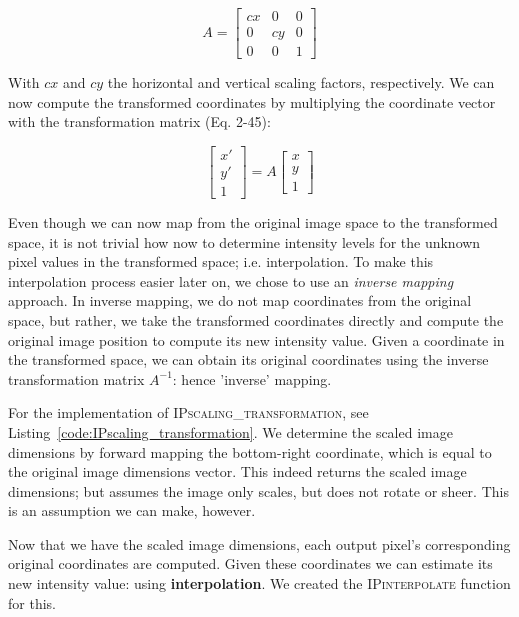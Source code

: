 \documentclass{article}
\begin{document}
\begin{figure}[ht]
\[A = 
\begin{bmatrix}
cx & 0 & 0\\
0 & cy & 0\\
0 & 0 & 1
\end{bmatrix}
 \]
\end{figure}

With $cx$ and $cy$ the horizontal and vertical scaling factors, respectively. We can now compute the transformed coordinates by multiplying the coordinate vector with the transformation matrix (Eq. 2-45):

\begin{figure}[ht]
\[ 
\begin{bmatrix}
x'\\
y'\\
1
\end{bmatrix}
= A
\begin{bmatrix}
x\\
y\\
1
\end{bmatrix}
 \]
\end{figure}

Even though we can now map from the original image space to the transformed space, it is not trivial how now to determine intensity levels for the unknown pixel values in the transformed space; i.e. interpolation. To make this interpolation process easier later on, we chose to use an \textit{inverse mapping} approach. In inverse mapping, we do not map coordinates from the original space, but rather, we take the transformed coordinates directly and compute the original image position to compute its new intensity value. Given a coordinate in the transformed space, we can obtain its original coordinates using the inverse transformation matrix $A^{-1}$: hence 'inverse' mapping.

 For the implementation of \textsc{IPscaling\_transformation}, see Listing~\ref{code:IPscaling_transformation}. We determine the scaled image dimensions by forward mapping the bottom-right coordinate, which is equal to the original image dimensions vector. This indeed returns the scaled image dimensions; but assumes the image only scales, but does not rotate or sheer. This is an assumption we can make, however.

Now that we have the scaled image dimensions, each output pixel's corresponding original coordinates are computed. Given these coordinates we can estimate its new intensity value: using \textbf{interpolation}. We created the \textsc{IPinterpolate} function for this.
\end{document}
